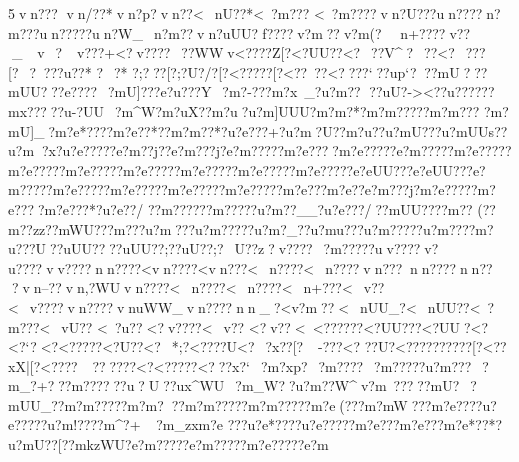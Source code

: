 {{{{{{{{{{{{{{{{{{{{{{{{{{{{{{{{{{{{{{{{{{{{{{{{{{{{{{{{{{{{{{{{{{{{{{{{{{{{{{{{{{{{{{{{{{{{{{{{{{{{{{{{{{{{{{{{{{{{{{{{{{{{{{{{{{{{{{{{{{{{{{{{{{{{{{{{{{{{{{{{{{{{{{{{{{{{{{{{{{{{{{{{{{{{{{{{{{{{{{{{{{{{{{{{{{{{{{{{{{{{{{{{{{{{{{{{{{{{{{{{{{{{{{{{{{{{{{{{{{{{{{{{{{{{{{{{{{{{{{{{{{{{{{{{{{{{{{{{{{{{{{{{{{{{{{{{{{{{{{{{{{{{{{{{{{{{{{{{{{{{{{{{{{{{{{{{{{{{{{{{{{{{{{{{{{{{{{{{{{{{{{{{{{{{{{{{{{{{{{{{{{{{{{{{{{{{{{{{{{{{{{{{{{{{{{{{{{{{{{{{{{{{{{{{{{{{{{{{{{{{{{{{{{{{{{{{{{{{{{{{{{{{{{{{{{{{{{{{{{{{{{{{{{{{{{{{{{{{{{{{{{{{{{{{{{{{{{{{{{{{{{{{{{{{{{{{{{{{{{{{{{{{{{{{{{{{{{{{{{{{{{{{{{{{{{{{{{{{{{{{{{{{{{{{{{{{{{{{{{{{{{{{{{{{{{{{{{{{{{{{{{{{{{{{{{{{{{{{{{{{{{{{{{{{{{{{{{{{{{{{{{{{{{{{{{{{{{{{{{{{{{{{{{{{{{{{{{{{{{{{{{{{{{{{{{{{{{{{{{{{{{{{{{{{{{{{{{{{{{{{{{{{{{{{{{{{{{{{{{{{{{{{{{{{{{{{{{{{{{{{{{{{{{{{{{{{{{{{{{{{{{{{{{{{{{{{{{{{{{{{{{{{{{{{{{{{{{{{{{5vn???
vn/??*vn?p? vn}??<~nU??*<~?m???
<~?m????vn?U???un????n?m???un?????un?W_~n?m??vn?uUU?}f????v?m ??v?m(? ~n+????}v??_~v~}?~v???+<?v????\?~??WWv<????Z[?<?UU??<?~??V^?~??<?~???[?~??{??u??*
{?~?*
 {?;???[?;?U?/?[?<?????[?<??~??<?? ??`??up`???mU? ??mUU? ??e????~?mU]???e?u???Y~?m?-??}?m?x~_?u?m??
??uU?-><??u?????}?mx?????u-?UU~?m\Z^W?m?uX?  ?m?u   ?u?m]UUU?m?m?*?m?m?????m?m???
?m?mU]_?m?e*????m?e??*??m?m??*?u?e???+?u?m?U??m?u?   ?u?mU?}??u?mUUs??u?m?x?u?e?????e?m??j??e?m???j?e?m?????m?e????m?e?????e?m?????m?e?????m?e?????m?e?????m?e?????m?e?????m?e?????m?e?????e?eUU???e?eUU???e?m?????m?e?????m?e?????m?e?????m?e?????m?e???m?e??e?m???j?m?e?????m?e????m?e???*?u?e??/
?}?m?????}?m?????u?m??__?u?e???/??mUU???}?m??
(?}?m??zz?}?mWU??}?m???u?m???u?m?????u?m?}_??u?mu?? ?u?m?????u?m??? ?m?u???U??uUU????uUU??;??uU??;?~U??z?v????~?m?????uv????v?u????vv????nn????<vn????<vn???<~n????<~n????vn???nn????nn???vn--??vn,?WUvn????<~n????<~n????<~n+???<~v??
<~v????vn????vnuWW_vn????nn_?<v?m??<~nUU_?<~nUU??<~?m??? <~vU??
<~?u?? <?v????<~v??
 <?v??<~<?????{?<?UU??{?<?UU?<?<?`? <?<?????\?<?U??<?~*   ;?<????U<?~?x??[?~-??{?<?
??U{?<?????{?\?????[?<??xX|[?<????\?~??\?????<?<?????<???x?`~?m?xp?~?m????~?m?????u?m ???~?m_?+???m??????u?U??ux^WU~?m_W??u?m??W^v?m~?????mU}?~?mUU_??m?m?????m?m???m?m?????m?m?????m?e(???m?mW???m?e??? ?u?e?????u?m!???}?m^?+
~?m_zx\?m?e 
???u?e*????u?e?????m?e???m?e???m?e*??*?u?mU??[?}?mkzWU?e?m?????e?m?????m?e?????e?m
}}}}}}}}}}}}}}}}}}}}}}}}}}}}}}}}}}}}}}}}}}}}}}}}}}}}}}}}}}}}}}}}}}}}}}}}}}}}}}}}}}}}}}}}}}}}}}}}}}}}}}}}}}}}}}}}}}}}}}}}}}}}}}}}}}}}}}}}}}}}}}}}}}}}}}}}}}}}}}}}}}}}}}}}}}}}}}}}}}}}}}}}}}}}}}}}}}}}}}}}}}}}}}}}}}}}}}}}}}}}}}}}}}}}}}}}}}}}}}}}}}}}}}}}}}}}}}}}}}}}}}}}}}}}}}}}}}}}}}}}}}}}}}}}}}}}}}}}}}}}}}}}}}}}}}}}}}}}}}}}}}}}}}}}}}}}}}}}}}}}}}}}}}}}}}}}}}}}}}}}}}}}}}}}}}}}}}}}}}}}}}}}}}}}}}}}}}}}}}}}}}}}}}}}}}}}}}}}}}}}}}}}}}}}}}}}}}}}}}}}}}}}}}}}}}}}}}}}}}}}}}}}}}}}}}}}}}}}}}}}}}}}}}}}}}}}}}}}}}}}}}}}}}}}}}}}}}}}}}}}}}}}}}}}}}}}}}}}}}}}}}}}}}}}}}}}}}}}}}}}}}}}}}}}}}}}}}}}}}}}}}}}}}}}}}}}}}}}}}}}}}}}}}}}}}}}}}}}}}}}}}}}}}}}}}}}}}}}}}}}}}}}}}}}}}}}}}}}}}}}}}}}}}}}}}}}}}}}}}}}}}}}}}}}}}}}}}}}}}}}}}}}}}}}}}}}}}}}}}}}}}}}}}}}}}}}}}}}}}}}}}}}}}}}}}}}}}}}}}}}}}}}}}}}}}}}}}}}}}}}}}}}}}}}}}}}}}}}}}}}}}}}}}}}}}}}}}}}}}}}}}}}}}}}}}}}}}}}}}}}}}}}}}}}}
